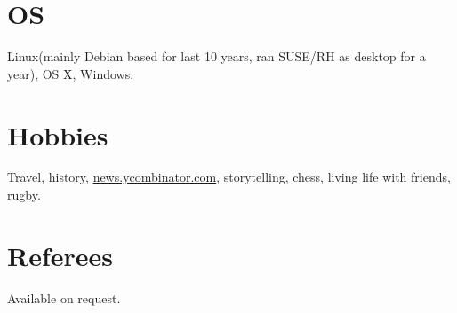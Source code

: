 \documentclass[margin,line]{resume}
\begin{document}
\begin{resume}
    \section{\mysidestyle OS}
    Linux(mainly Debian based for last 10 years, ran SUSE/RH as desktop for a year), OS X, Windows.

    \section{\mysidestyle Hobbies}
    Travel, history, \href{http://news.ycombinator.com}{news.ycombinator.com}, storytelling, chess, living life with friends, rugby.

    \section{\mysidestyle Referees}
    Available on request.

\end{resume}
\end{document}

